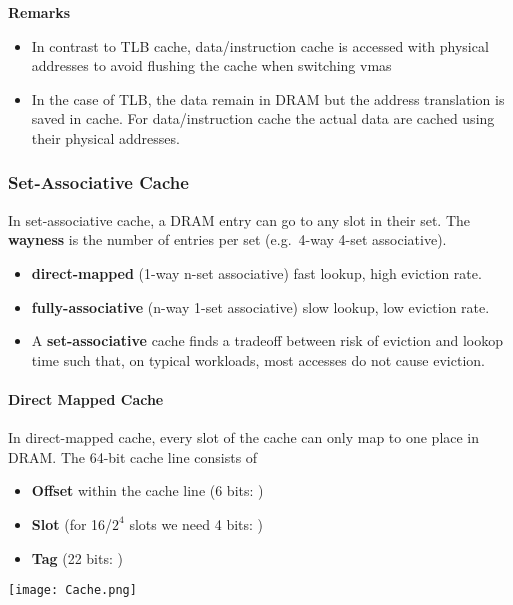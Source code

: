 \newpar{}
\textbf{Remarks}
\begin{itemize}
    \item In contrast to TLB cache, data/instruction cache is accessed with physical addresses to avoid flushing the cache when switching vmas
    \item In the case of TLB, the data remain in DRAM but the address translation is saved in cache. For data/instruction cache the actual data are cached using their physical addresses.
\end{itemize}

\subsubsection{Set-Associative Cache}
In set-associative cache, a DRAM entry can go to any slot in their set. The \textbf{wayness} is the number of entries per set (e.g.\ 4-way 4-set associative).

\begin{itemize}
    \item \textbf{direct-mapped} (1-way n-set associative) fast lookup, high eviction rate. %
    \item \textbf{fully-associative} (n-way 1-set associative) slow lookup, low eviction rate. %
    \item A \textbf{set-associative} cache finds a tradeoff between risk of eviction and lookop time such that, on typical workloads, most accesses do not cause eviction.
\end{itemize}

\paragraph{Direct Mapped Cache}
In direct-mapped cache, every slot of the cache can only map to one place in DRAM.
\newpar{}
The 64-bit cache line consists of
\begin{itemize}
    \item \textbf{Offset} within the cache line (6 bits: )
    \item \textbf{Slot} (for 16/$2^4$ slots we need 4 bits: )
    \item \textbf{Tag} (22 bits: )
\end{itemize}
\texttt{[image: Cache.png]}

